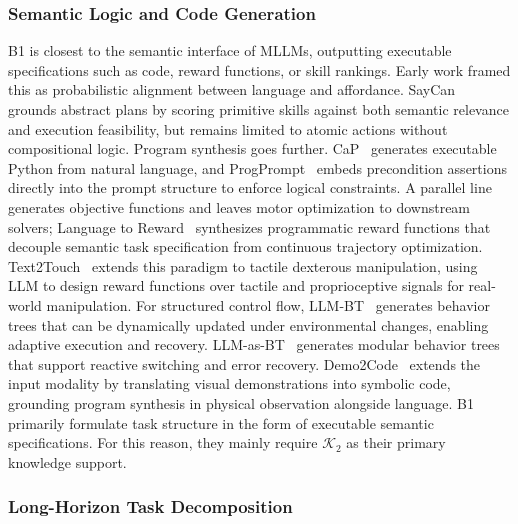 \documentclass[acmsmall,screen,review]{acmart}
\begin{document}
\subsubsection{Semantic Logic and Code Generation}\label{sec:code_gen}

B1 is closest to the semantic interface of MLLMs, outputting executable specifications such as code, reward functions, or skill rankings. 
Early work framed this as probabilistic alignment between language and affordance. 
SayCan~\cite{brohan2023can} grounds abstract plans by scoring primitive skills against both semantic relevance and execution feasibility, but remains limited to atomic actions without compositional logic. 
Program synthesis goes further. CaP~\cite{liang2022code} generates executable Python from natural language, and ProgPrompt~\cite{singh2022progprompt} embeds precondition assertions directly into the prompt structure to enforce logical constraints. 
A parallel line generates objective functions and leaves motor optimization to downstream solvers; Language to Reward~\cite{tan2023l2r} synthesizes programmatic reward functions that decouple semantic task specification from continuous trajectory optimization. 
Text2Touch~\cite{field2025text2touch} extends this paradigm to tactile dexterous manipulation, using LLM to design reward functions over tactile and proprioceptive signals for real-world manipulation. 
For structured control flow, LLM-BT~\cite{zhou2024llmbt} generates behavior trees that can be dynamically updated under environmental changes, enabling adaptive execution and recovery. 
LLM-as-BT~\cite{ao2025llmbt} generates modular behavior trees that support reactive switching and error recovery. 
Demo2Code~\cite{wang2023demo2code} extends the input modality by translating visual demonstrations into symbolic code, grounding program synthesis in physical observation alongside language. 
B1 primarily formulate task structure in the form of executable semantic specifications.
For this reason, they mainly require \(\mathcal{K}_2\) as their primary knowledge support. 

\subsubsection{Long-Horizon Task Decomposition}\label{sec:task_decomp}
\end{document}
